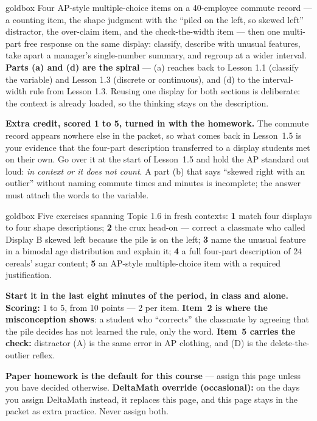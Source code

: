 \documentclass[10pt]{article}
\begin{document}
\boxguard
\begin{skillbox}{goldbox}
Four AP-style multiple-choice items on a 40-employee commute record --- a counting item, the
shape judgment with the ``piled on the left, so skewed left'' distractor, the over-claim item,
and the check-the-width item --- then one multi-part free response on the same display:
classify, describe with unusual features, take apart a manager's single-number summary, and
regroup at a wider interval. \textbf{Parts (a) and (d) are the spiral} --- (a) reaches back to
Lesson 1.1 (classify the variable) and Lesson 1.3 (discrete or continuous), and (d) to the
interval-width rule from Lesson 1.3. Reusing one display for both sections is deliberate: the
context is already loaded, so the thinking stays on the description.

\textbf{Extra credit, scored 1 to 5, turned in with the homework.} The commute
record appears nowhere else in the packet, so what comes back in Lesson~1.5 is your evidence
that the four-part description transferred to a display students met on their own. Go over it at
the start of Lesson~1.5 and hold the AP standard out loud: \emph{in context or it does not
count}. A part (b) that says ``skewed right with an outlier'' without naming commute times and
minutes is incomplete; the answer must attach the words to the variable.
\end{skillbox}

\boxguard
\begin{skillbox}{goldbox}
Five exercises spanning Topic 1.6 in fresh contexts: \textbf{1} match four displays to four
shape descriptions; \textbf{2} the crux head-on --- correct a classmate who called Display B
skewed left because the pile is on the left; \textbf{3} name the unusual feature in a bimodal
age distribution and explain it; \textbf{4} a full four-part description of 24 cereals' sugar
content; \textbf{5} an AP-style multiple-choice item with a required justification.

\textbf{Start it in the last eight minutes of the period, in class and alone.} \textbf{Scoring:}
1 to 5, from 10 points --- 2 per item. \textbf{Item~2 is where the misconception shows}: a student who
``corrects'' the classmate by agreeing that the pile decides has not learned the rule, only the
word. \textbf{Item~5 carries the check:} distractor (A) is the same error in AP clothing, and
(D) is the delete-the-outlier reflex.

\textbf{Paper homework is the default for this course} --- assign this page unless you have
decided otherwise. \textbf{DeltaMath override (occasional):} on the days you assign DeltaMath
instead, it replaces this page, and this page
stays in the packet as extra practice. Never assign both.
\end{skillbox}
\end{document}
